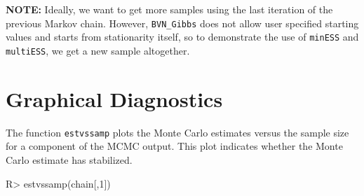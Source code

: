 \documentclass[11pt]{article}
\begin{document}
\bigskip

\textbf{NOTE:} Ideally, we want to get more samples using the last iteration of the previous Markov chain. However, \texttt{BVN\_Gibbs} does not allow user specified starting values and starts from stationarity itself, so to demonstrate the use of \texttt{minESS} and \texttt{multiESS}, we get a new sample altogether. 

\bigskip

\section{Graphical Diagnostics}

The function \texttt{estvssamp} plots the Monte Carlo estimates versus the sample size for a component of the MCMC output. This plot indicates whether the Monte Carlo estimate has stabilized.

\begin{Schunk}
\begin{Sinput}
R> estvssamp(chain[,1])
\end{Sinput}
\end{Schunk}



\end{document}
